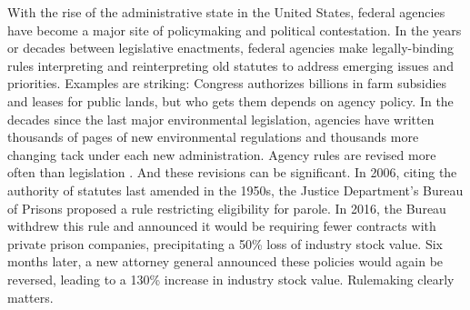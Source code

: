 With the rise of the administrative state in the United States, federal agencies have become a major site of policymaking and political contestation. In the years or decades between legislative enactments, federal agencies make legally-binding rules interpreting and reinterpreting old statutes to address emerging issues and priorities. %
Examples are striking: %
Congress authorizes billions in farm subsidies and leases for public lands, but who gets them depends on agency policy. In the decades since the last major environmental legislation, agencies have written thousands of pages of new environmental regulations and thousands more changing tack under each new administration. Agency rules are revised more often than legislation \citep{Wagner2017DynamicRulemaking}.
 And these revisions can be significant. In 2006, citing the authority of statutes last amended in the 1950s, the Justice Department's Bureau of Prisons proposed a rule restricting eligibility for parole. In 2016, the Bureau withdrew this rule and announced it would be requiring fewer contracts with private prison companies, precipitating a 50\% loss of industry stock value. Six months later, a new attorney general announced these policies would again be reversed, leading to a 130\% increase in industry stock value. %
Rulemaking clearly matters.

